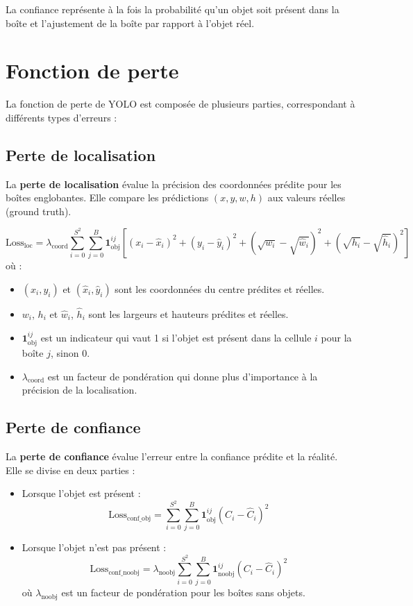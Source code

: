 \documentclass[a4paper,12pt]{article}
\begin{document}
La confiance représente à la fois la probabilité qu'un objet soit présent dans la boîte et l'ajustement de la boîte par rapport à l'objet réel.

\section{Fonction de perte}
La fonction de perte de YOLO est composée de plusieurs parties, correspondant à différents types d'erreurs :

\subsection{Perte de localisation}
La \textbf{perte de localisation} évalue la précision des coordonnées prédite pour les boîtes englobantes. Elle compare les prédictions $(x, y, w, h)$ aux valeurs réelles (ground truth).

\[
\text{Loss}_{\text{loc}} = \lambda_{\text{coord}} \sum_{i=0}^{S^2} \sum_{j=0}^{B} \mathbf{1}_{\text{obj}}^{ij} \left[ (x_i - \hat{x}_i)^2 + (y_i - \hat{y}_i)^2 + \left( \sqrt{w_i} - \sqrt{\hat{w}_i} \right)^2 + \left( \sqrt{h_i} - \sqrt{\hat{h}_i} \right)^2 \right]
\]
où :
\begin{itemize}
    \item $(x_i, y_i)$ et $(\hat{x}_i, \hat{y}_i)$ sont les coordonnées du centre prédites et réelles.
    \item $w_i$, $h_i$ et $\hat{w}_i$, $\hat{h}_i$ sont les largeurs et hauteurs prédites et réelles.
    \item $\mathbf{1}_{\text{obj}}^{ij}$ est un indicateur qui vaut 1 si l'objet est présent dans la cellule $i$ pour la boîte $j$, sinon 0.
    \item $\lambda_{\text{coord}}$ est un facteur de pondération qui donne plus d'importance à la précision de la localisation.
\end{itemize}

\subsection{Perte de confiance}
La \textbf{perte de confiance} évalue l'erreur entre la confiance prédite et la réalité. Elle se divise en deux parties :
\begin{itemize}
    \item Lorsque l'objet est présent :
    \[
    \text{Loss}_{\text{conf\_obj}} = \sum_{i=0}^{S^2} \sum_{j=0}^{B} \mathbf{1}_{\text{obj}}^{ij} (C_i - \hat{C}_i)^2
    \]
    \item Lorsque l'objet n'est pas présent :
    \[
    \text{Loss}_{\text{conf\_noobj}} = \lambda_{\text{noobj}} \sum_{i=0}^{S^2} \sum_{j=0}^{B} \mathbf{1}_{\text{noobj}}^{ij} (C_i - \hat{C}_i)^2
    \]
    où $\lambda_{\text{noobj}}$ est un facteur de pondération pour les boîtes sans objets.
\end{itemize}
\end{document}
